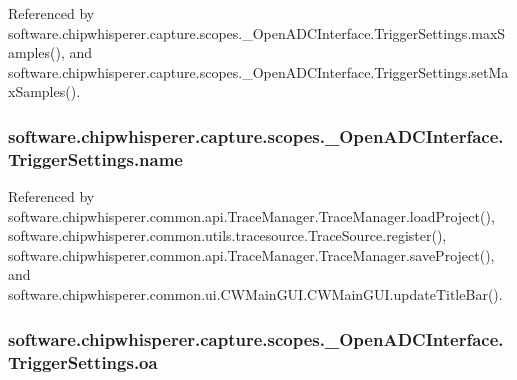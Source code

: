 Referenced by software.\+chipwhisperer.\+capture.\+scopes.\+\_\+\+Open\+A\+D\+C\+Interface.\+Trigger\+Settings.\+max\+Samples(), and software.\+chipwhisperer.\+capture.\+scopes.\+\_\+\+Open\+A\+D\+C\+Interface.\+Trigger\+Settings.\+set\+Max\+Samples().

\hypertarget{classsoftware_1_1chipwhisperer_1_1capture_1_1scopes_1_1__OpenADCInterface_1_1TriggerSettings_acd5cbd01eb4c0d48caa7419d9501ffb1}{}
\subsubsection[{name}]{\setlength{\rightskip}{0pt plus 5cm}software.\+chipwhisperer.\+capture.\+scopes.\+\_\+\+Open\+A\+D\+C\+Interface.\+Trigger\+Settings.\+name}\label{classsoftware_1_1chipwhisperer_1_1capture_1_1scopes_1_1__OpenADCInterface_1_1TriggerSettings_acd5cbd01eb4c0d48caa7419d9501ffb1}


Referenced by software.\+chipwhisperer.\+common.\+api.\+Trace\+Manager.\+Trace\+Manager.\+load\+Project(), software.\+chipwhisperer.\+common.\+utils.\+tracesource.\+Trace\+Source.\+register(), software.\+chipwhisperer.\+common.\+api.\+Trace\+Manager.\+Trace\+Manager.\+save\+Project(), and software.\+chipwhisperer.\+common.\+ui.\+C\+W\+Main\+G\+U\+I.\+C\+W\+Main\+G\+U\+I.\+update\+Title\+Bar().

\hypertarget{classsoftware_1_1chipwhisperer_1_1capture_1_1scopes_1_1__OpenADCInterface_1_1TriggerSettings_a4f80c07ef89fc937a522a1aba81aab79}{}
\subsubsection[{oa}]{\setlength{\rightskip}{0pt plus 5cm}software.\+chipwhisperer.\+capture.\+scopes.\+\_\+\+Open\+A\+D\+C\+Interface.\+Trigger\+Settings.\+oa}\label{classsoftware_1_1chipwhisperer_1_1capture_1_1scopes_1_1__OpenADCInterface_1_1TriggerSettings_a4f80c07ef89fc937a522a1aba81aab79}


